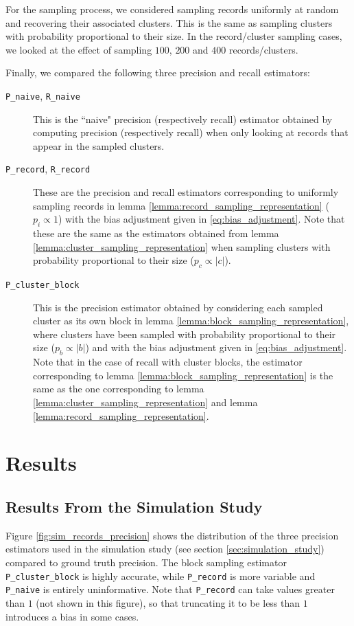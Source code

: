 \documentclass[fontsize=11pt]{article}
\theoremstyle{definition}
\begin{document}
For the sampling process, we considered sampling records uniformly at random and recovering their associated clusters. This is the same as sampling clusters with probability proportional to their size. In the record/cluster sampling cases, we looked at the effect of sampling $100$, $200$ and $400$ records/clusters.

Finally, we compared the following three precision and recall estimators:
\begin{description}
    \item[\texttt{P\_naive}, \texttt{R\_naive}] This is the ``naive" precision (respectively recall) estimator obtained by computing precision (respectively recall) when only looking at records that appear in the sampled clusters.
    \item[\texttt{P\_record}, \texttt{R\_record}] These are the precision and recall estimators corresponding to uniformly sampling records in lemma \ref{lemma:record_sampling_representation} ($p_i \propto 1$) with the bias adjustment given in \eqref{eq:bias_adjustment}. Note that these are the same as the estimators obtained from lemma \ref{lemma:cluster_sampling_representation} when sampling clusters with probability proportional to their size ($p_c \propto \lvert c \rvert$).
    \item[\texttt{P\_cluster\_block}] This is the precision estimator obtained by considering each sampled cluster as its own block in lemma \ref{lemma:block_sampling_representation}, where clusters have been sampled with probability proportional to their size ($p_b \propto \lvert b \rvert$) and with the bias adjustment given in \eqref{eq:bias_adjustment}. Note that in the case of recall with cluster blocks, the estimator corresponding to lemma \ref{lemma:block_sampling_representation} is the same as the one corresponding to lemma \ref{lemma:cluster_sampling_representation} and lemma \ref{lemma:record_sampling_representation}.
\end{description}

\section{Results}\label{sec:results}

\subsection{Results From the Simulation Study}

Figure \ref{fig:sim_records_precision} shows the distribution of the three precision estimators used in the simulation study (see section \ref{sec:simulation_study}) compared to ground truth precision. The block sampling estimator \texttt{P\_cluster\_block} is highly accurate, while \texttt{P\_record} is more variable and \texttt{P\_naive} is entirely uninformative. Note that \texttt{P\_record} can take values greater than $1$ (not shown in this figure), so that truncating it to be less than $1$ introduces a bias in some cases.
\end{document}
